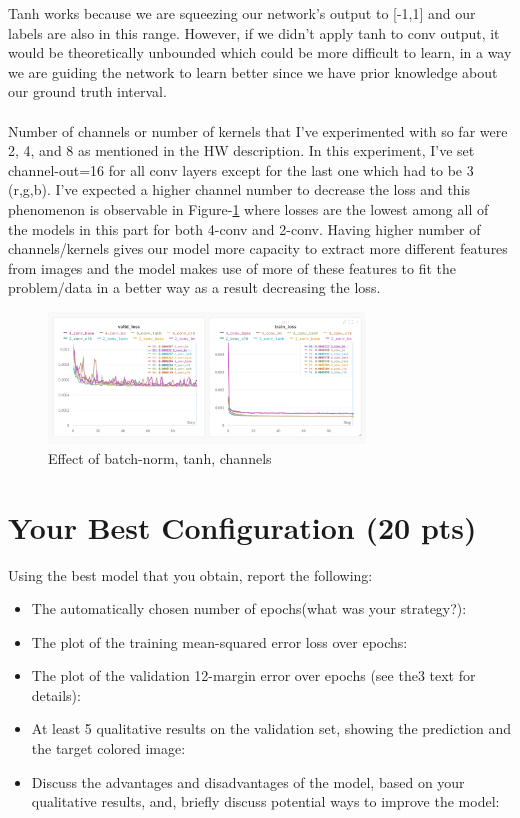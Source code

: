 \documentclass[12pt]{article}
\begin{document}
\begin{center}
        Tanh works because we are squeezing our network's output to [-1,1] and our labels are also in this range. However, if we didn't apply tanh to conv output, it would be theoretically unbounded
        which could be more difficult to learn, in a way we are guiding the network to learn better since we have prior knowledge about our ground truth interval.
        \\~\\
        Number of channels or number of kernels that I've experimented with so far were 2, 4, and 8 as mentioned in the HW description.
        In this experiment, I've set channel-out=16 for all conv layers except for the last one which had to be 3 (r,g,b).
        I've expected a higher channel number to decrease the loss and this phenomenon is observable in Figure-\ref*{fig:part-2} where
        losses are the lowest among all of the models in this part for both 4-conv and 2-conv.
        Having higher number of channels/kernels gives our model more capacity to extract more different features from images
        and the model makes use of more of these features to fit the problem/data in a better way as a result decreasing the loss.


    \end{center}

    \begin{figure}[!htb]
        \centering
        \includegraphics[width=0.75\textwidth]{figures/part-2.png}
        \caption{Effect of batch-norm, tanh, channels}
        \label{fig:part-2}
    \end{figure}

\section{Your Best Configuration (20 pts)}
Using the best model that you obtain, report the following:
 
    \begin{itemize}
        \item The automatically chosen number of epochs(what was your strategy?):
        \item The plot of the training mean-squared error loss over epochs:
        \item The  plot  of  the  validation  12-margin  error  over  epochs (see the3 text for details):
        \item At least 5 qualitative results on the validation set, showing the prediction and the target colored image:
        \item Discuss the advantages and disadvantages of the model, based on your qualitative results, and, briefly discuss potential ways to improve the model:
    \end{itemize}
    
\end{document}
